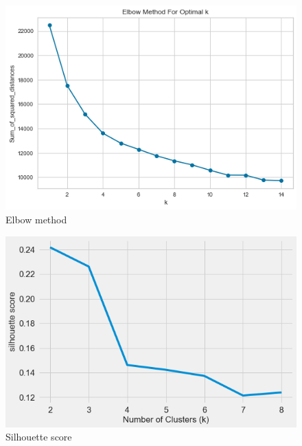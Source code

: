 \documentclass[format=sigconf]{acmart}
\begin{document}
\begin{figure}[H]
    \centering
    \includegraphics[scale=0.45]{images/elbow_method_1.png}
    \caption{Elbow method}
    \label{fig:elbowMethod}
\end{figure}
\begin{figure}[H]
    \centering
    \includegraphics[scale=0.40]{images/silhouette_score_1.png}
    \caption{Silhouette score}
    \label{fig:silScore}
\end{figure}
\end{document}
